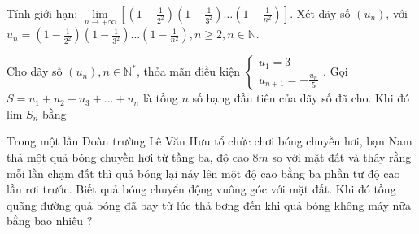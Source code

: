 \begin{bt}%
	Tính giới hạn: $\lim \limits_{n \to +\infty}\left[\left(1-\frac{1}{2^2}\right)\left(1-\frac{1}{3^2}\right) \ldots\left(1-\frac{1}{n^2}\right)\right]$.
	Xét dãy số $\left(u_n\right)$, với $u_n=\left(1-\frac{1}{2^2}\right)\left(1-\frac{1}{3^2}\right) \ldots\left(1-\frac{1}{n^2}\right), n \geq 2, n \in \mathbb{N}$.
\end{bt}
\begin{bt}%
	
	Cho dãy số $\left(u_n\right), n \in \mathbb{N}^*$, thỏa mãn điều kiện $\left\{\begin{array}{c}u_1=3 \\ u_{n+1}=-\frac{u_n}{5}\end{array}\right.$. Gọi $S=u_1+u_2+u_3+\ldots+u_n$ là tồng $n$ số hạng đầu tiên của dãy số đã cho. Khi đó lim $S_n$ bằng
\end{bt}
\begin{bt}%
	Trong một lần Đoàn trường Lê Văn Hưu tổ chức chơi bóng chuyền hơi, bạn Nam thả một quả bóng chuyền hơi từ tầng ba, độ cao $8 m$ so với mặt đất và thây rằng mỗi lần chạm đất thì quả bóng lại nảy lên một độ cao bằng ba phần tư độ cao lần rơi trước. Biết quả bóng chuyển động vuông góc với mặt đất. Khi đó tồng quãng đường quả bóng đã bay từ lúc thả bơng đến khi quả bóng không máy nữa bằng bao nhiêu ?
\end{bt}
